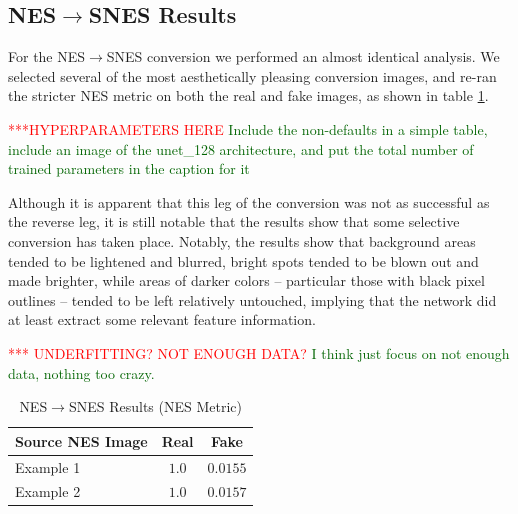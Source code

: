 \documentclass[10pt,twocolumn,letterpaper]{article}
\begin{document}
\subsection{NES$\rightarrow$SNES Results}

For the NES$\rightarrow$SNES conversion we performed an almost identical analysis. We selected several of the most aesthetically pleasing conversion images, and re-ran the stricter NES metric on both the real and fake images, as shown in table \ref{tab:snesresults}.

\textcolor{red}{***HYPERPARAMETERS HERE}
\textcolor{darkgreen} {Include the non-defaults in a simple table, include an image of the unet\_128 architecture, and put the total number of trained parameters in the caption for it}

Although it is apparent that this leg of the conversion was not as successful as the reverse leg, it is still notable that the results show that some selective conversion has taken place. Notably, the results show that background areas tended to be lightened and blurred, bright spots tended to be blown out and made brighter, while areas of darker colors \--- particular those with black pixel outlines \--- tended to be left relatively untouched, implying that the network did at least extract some relevant feature information.

\textcolor{red}{*** UNDERFITTING? NOT ENOUGH DATA?}
\textcolor{darkgreen} {I think just focus on not enough data, nothing too crazy.}

\begin{table}
   \begin{center}
      \begin{tabular}{|l|c|c|}
         \hline
         Source NES Image & Real  & Fake     \\
         \hline\hline
         Example 1        & $1.0$ & $0.0155$ \\
         Example 2        & $1.0$ & $0.0157$ \\
         \hline
      \end{tabular}
   \end{center}
   \caption{NES$\rightarrow$SNES Results (NES Metric)}
   \label{tab:snesresults}
\end{table}
\end{document}
